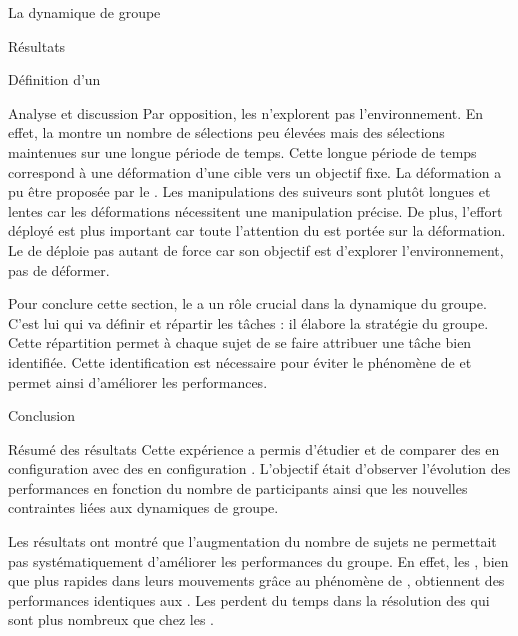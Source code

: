 \documentclass[myfrancais,ngerman,english,french]{mythesis}
\begin{document}
\begin{mychapter}{La dynamique de groupe}
\begin{mysection}{Résultats}
\begin{mysubsection}{Définition d'un }
\begin{mysubsubsection}{Analyse et discussion}
					Par opposition, les  n'explorent pas l'environnement.
					En effet, la  montre un nombre de sélections peu élevées mais des sélections maintenues sur une longue période de temps.
					Cette longue période de temps correspond à une déformation d'une cible vers un objectif fixe.
					La déformation a pu être proposée par le .
					Les manipulations des suiveurs sont plutôt longues et lentes  car les déformations nécessitent une manipulation précise.
					De plus, l'effort déployé est plus important car toute l'attention du  est portée sur la déformation.
					Le  de déploie pas autant de force car son objectif est d'explorer l'environnement, pas de déformer.

					Pour conclure cette section, le  a un rôle crucial dans la dynamique du groupe.
					C'est lui qui va définir et répartir les tâches : il élabore la stratégie du groupe.
					Cette répartition permet à chaque sujet de se faire attribuer une tâche bien identifiée.
					Cette identification est nécessaire pour éviter le phénomène de   et permet ainsi d'améliorer les performances.
				\end{mysubsubsection}
			\end{mysubsection}
		\end{mysection}
		\begin{mysection}{Conclusion}
			\begin{mysubsection}{Résumé des résultats}
				Cette expérience a permis d'étudier et de comparer des  en configuration  avec des  en configuration .
				L'objectif était d'observer l'évolution des performances en fonction du nombre de participants ainsi que les nouvelles contraintes liées aux dynamiques de groupe.

				Les résultats ont montré que l'augmentation du nombre de sujets ne permettait pas systématiquement d'améliorer les performances du groupe.
				En effet, les , bien que plus rapides dans leurs mouvements grâce au phénomène de , obtiennent des performances identiques aux .
				Les  perdent du temps dans la résolution des  qui sont plus nombreux que chez les .


\end{mysubsection}
\end{mysection}
\end{mychapter}
\end{document}
